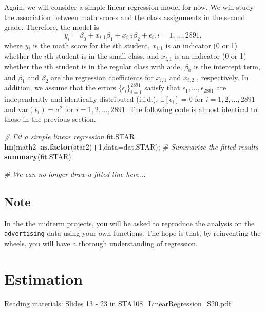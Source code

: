 \documentclass[12pt,]{book}
\newenvironment{Shaded}{\begin{snugshade}}{\end{snugshade}}
\newcommand{\KeywordTok}[1]{\textcolor[rgb]{0.13,0.29,0.53}{\textbf{#1}}}
\newcommand{\DataTypeTok}[1]{\textcolor[rgb]{0.13,0.29,0.53}{#1}}
\newcommand{\DecValTok}[1]{\textcolor[rgb]{0.00,0.00,0.81}{#1}}
\newcommand{\StringTok}[1]{\textcolor[rgb]{0.31,0.60,0.02}{#1}}
\newcommand{\CommentTok}[1]{\textcolor[rgb]{0.56,0.35,0.01}{\textit{#1}}}
\newcommand{\OperatorTok}[1]{\textcolor[rgb]{0.81,0.36,0.00}{\textbf{#1}}}
\newcommand{\NormalTok}[1]{#1}
\begin{document}
Again, we will consider a simple linear regression model for now. We
will study the association between math scores and the class assignments
in the second grade. Therefore, the model is \[
    y_i =\beta_0 + x_{i,1} \beta_1  +x_{i,2} \beta_2  +  \epsilon_i, i=1,\ldots, 2891,
    \] where \(y_i\) is the math score for the \(i\)th student,
\(x_{i,1}\) is an indicator (0 or 1) whether the \(i\)th student is in
the small class, and \(x_{i,1}\) is an indicator (0 or 1) whether the
\(i\)th student is in the regular class with aide, \(\beta_0\) is the
intercept term, and \(\beta_1\) and \(\beta_2\) are the regression
coefficients for \(x_{i,1}\) and \(x_{i,2}\) , respectively. In
addition, we assume that the errors \(\{\epsilon_i\}_{i=1}^{2891}\)
satisfy that \(\epsilon_1,\ldots, \epsilon_2891\) are independently and
identically distributed (i.i.d.), \(\mathbb{E}[\epsilon_i]= 0\) for
\(i=1,2,\ldots, 2891\) and \(\mathrm{var}(\epsilon_i)=\sigma^2\) for
\(i=1,2,\ldots, 2891\). The following code is almost identical to those
in the previous section.

\begin{Shaded}
\begin{Highlighting}[]
\CommentTok{# Fit a simple linear regression}
\NormalTok{fit.STAR=}\StringTok{ }\KeywordTok{lm}\NormalTok{(math2}\OperatorTok{~}\KeywordTok{as.factor}\NormalTok{(star2)}\OperatorTok{+}\DecValTok{1}\NormalTok{,}\DataTypeTok{data=}\NormalTok{dat.STAR); }
\CommentTok{# Summarize the fitted results}
\KeywordTok{summary}\NormalTok{(fit.STAR) }

\CommentTok{# We can no longer draw a fitted line here...}
\end{Highlighting}
\end{Shaded}

\section{Note}\label{note}

In the the midterm projects, you will be asked to reproduce the analysis
on the \texttt{advertising} data using your own functions. The hope is
that, by reinventing the wheels, you will have a thorough understanding
of regression.

\chapter{Estimation}\label{ch:est}

Reading materials: Slides 13 - 23 in STA108\_LinearRegression\_S20.pdf
\end{document}
